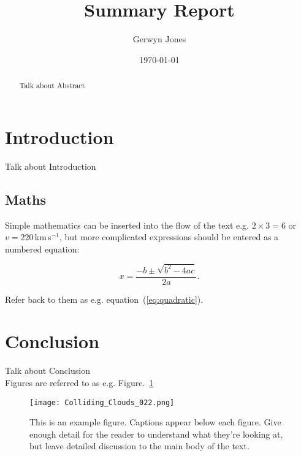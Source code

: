 \documentclass[11pt, a4paper]{article}
\begin{document}
\title{Summary Report}

\author{Gerwyn Jones}

\date{\today}

\maketitle


\begin{abstract}

Talk about Abstract

\end{abstract}




\section{\label{sec:level1} Introduction }

Talk about Introduction

\cite{Bartelli.Motta.2016}

\subsection{Maths}
\label{sec:maths} %

Simple mathematics can be inserted into the flow of the text e.g. $2\times3=6$
or $v=220$\,km\,s$^{-1}$, but more complicated expressions should be entered
as a numbered equation:

\begin{equation}
    x=\frac{-b\pm\sqrt{b^2-4ac}}{2a}.
	\label{eq:quadratic}
\end{equation}

Refer back to them as e.g. equation~(\ref{eq:quadratic}).



\section{\label{sec:level2} Conclusion }

Talk about Conclusion
\\
Figures are referred to as e.g. Figure.~\ref{fig:example_figure}

\begin{figure}[h]
	\centering
	\texttt{[image: Colliding\_Clouds\_022.png]}
    \caption{This is an example figure. Captions appear below each figure.
	Give enough detail for the reader to understand what they're looking at,
	but leave detailed discussion to the main body of the text.}
    \label{fig:example_figure}
\end{figure}





\end{document}

